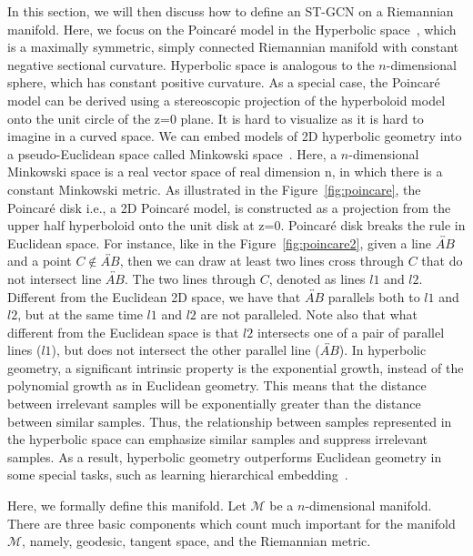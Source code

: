 \documentclass[letterpaper]{article} \usepackage{aaai19}  \usepackage{times}  \usepackage{helvet} \usepackage{courier}  \usepackage[hyphens]{url}  \usepackage{graphicx} \urlstyle{rm} \def\UrlFont{\rm}  \usepackage{graphicx}  \frenchspacing  \setlength{\pdfpagewidth}{8.5in}  \setlength{\pdfpageheight}{11in}
\begin{document}
In this section, we will then discuss how to define an ST-GCN on a Riemannian manifold. Here, we focus on the Poincar\'e model in the Hyperbolic space~\cite{reynolds1993hyperbolic}, which is a maximally symmetric, simply connected Riemannian manifold with constant negative sectional curvature. Hyperbolic space is analogous to the $n$-dimensional sphere, which has constant positive curvature.  As a special case, the Poincar\'e model can be derived using a stereoscopic projection of the hyperboloid model onto the unit circle of the z=0 plane. It is hard to visualize as it is hard to imagine in a curved space. We can embed models of 2D hyperbolic geometry into a pseudo-Euclidean space called Minkowski space~\cite{tataru2001strichartz}. Here, a $n$-dimensional Minkowski space is a real vector space of real dimension n, in which there is a constant Minkowski metric. As illustrated in the Figure~\ref{fig:poincare}, the Poincar\'e disk i.e., a 2D Poincar\'e model, is constructed as a projection from the upper half hyperboloid onto the unit disk at z=0. Poincar\'e disk breaks the rule in Euclidean space. For instance, like in the Figure~\ref{fig:poincare2}, given a line $\overleftrightarrow{AB}$ and a point $C \notin \overleftrightarrow{AB}$, then we can draw at least two lines cross through $C$ that do not intersect line $\overleftrightarrow{AB}$.  The two lines through $C$, denoted as lines $\mathit{l}1$ and $\mathit{l}2$. Different from the Euclidean 2D space, we have that $\overleftrightarrow{AB}$ parallels both to $\mathit{l}1$ and $\mathit{l}2$, but at the same time $\mathit{l}1$ and $\mathit{l}2$ are not paralleled. Note also that what different from the Euclidean space is that $\mathit{l}2$ intersects one of a pair of parallel lines ($\mathit{l}1$), but does not intersect the other parallel line ($\overleftrightarrow{AB}$). In hyperbolic geometry, a significant intrinsic property is the exponential growth, instead of the polynomial growth as in Euclidean geometry. This means that the distance between irrelevant samples will be exponentially greater than the distance between similar samples. Thus, the relationship between samples represented in the hyperbolic space can emphasize similar samples and suppress irrelevant samples. As a result, hyperbolic geometry outperforms Euclidean geometry in some special tasks, such as learning hierarchical embedding~\cite{ganea2018hyperbolic}.

Here, we formally define this manifold. Let $\mathcal{M}$ be a $n$-dimensional manifold. There are three basic components which count much important for the manifold $\mathcal{M}$, namely, geodesic, tangent space, and the Riemannian metric. 
\end{document}
